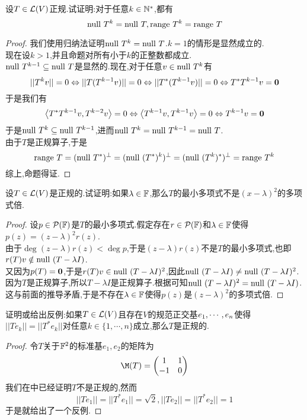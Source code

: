 \documentclass{ctexart}
\begin{document}
\begin{problem}[27.]
    设$T\in\mathcal{L}(V)$正规.试证明:对于任意$k\in\mathbb{N}^*$,都有
    \[\text{null } T^k=\text{null } T,\text{range } T^k=\text{range } T\]
\end{problem}
\begin{proof}
    我们使用归纳法证明$\text{null } T^k=\text{null } T$.$k=1$的情形是显然成立的.\\
    现在设$k>1$,并且命题对所有小于$k$的正整数都成立.\\
    $\text{null } T^{k-1}\subseteq\text{null } T$是显然的.现在,对于任意$v\in\text{null } T^k$有
    \[||T^k v||=0\Leftrightarrow||T(T^{k-1}v)||=0\Leftrightarrow||T^*(T^{k-1}v)||=0\Leftrightarrow T^*T^{k-1}v=\mathbf0\]
    于是我们有
    \[\left\langle{T^*T^{k-1}v},{T^{k-2}v}\right\rangle=0\Leftrightarrow\left\langle{T^{k-1}v},{T^{k-1}v}\right\rangle=0\Leftrightarrow T^{k-1}v=\mathbf0\]
    于是$\text{null } T^{k}\subseteq\text{null } T^{k-1}$,进而$\text{null } T^{k}=\text{null } T^{k-1}=\text{null } T$.\\
    由于$T$是正规算子,于是
    \[\text{range } T=(\text{null } T^*)^\bot=(\text{null } (T^*)^k)^\bot=(\text{null }(T^k)^*)^\bot=\text{range } T^k\]
    综上,命题得证.
\end{proof}
\begin{problem}[28.]
    设$T\in\mathcal{L}(V)$是正规的.试证明:如果$\lambda\in\mathbb{F}$,那么$T$的最小多项式不是$(x-\lambda)^2$的多项式倍.
\end{problem}
\begin{proof}
    设$p\in\mathcal{P}(\mathbb{F})$是$T$的最小多项式.假定存在$r\in\mathcal{P}(\mathbb{F})$和$\lambda\in\mathbb{F}$使得$p(z)=(z-\lambda)^2r(z)$.\\
    由于$\deg (z-\lambda)r(z)<\deg p$,于是$(z-\lambda)r(z)$不是$T$的最小多项式,也即$r(T)v\notin\text{null }(T-\lambda I)$.\\
    又因为$p(T)=\mathbf0$,于是$r(T)v\in\text{null }(T-\lambda I)^2$,因此$\text{null }(T-\lambda I)\neq\text{null }(T-\lambda I)^2$.\\
    因为$T$是正规算子,所以$T-\lambda I$是正规算子.根据可知$\text{null }(T-\lambda I)^2=\text{null } (T-\lambda I)$.\\
    这与前面的推导矛盾,于是不存在$\lambda\in\mathbb{F}$使得$p(z)$是$(z-\lambda)^2$的多项式倍.
\end{proof}
\begin{problem}[29.]
    证明或给出反例:如果$T\in\mathcal{L}(V)$且存在$V$的规范正交基${e}_1,\cdots,{e}_{n}$使得$||Te_k||=||T^*e_k||$对任意$k\in\{1,\cdots,n\}$成立,那么$T$是正规的.
\end{problem}
\begin{proof}
    令$T$关于$\mathbb{F}^2$的标准基$e_1,e_2$的矩阵为
    \[\M(T)=\begin{pmatrix}
        1&1\\-1&0
    \end{pmatrix}\]
    我们在中已经证明$T$不是正规的,然而
    \[||Te_1||=||T^*e_1||=\sqrt2,||Te_2||=||T^*e_2||=1\]
    于是就给出了一个反例.
\end{proof}
\end{document}
